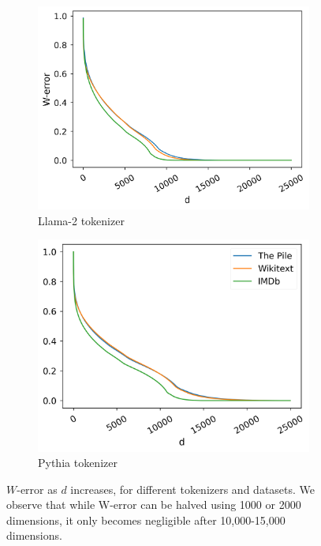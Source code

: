 \begin{figure}[h]
\centering
    \begin{subfigure}{0.415\columnwidth}
         \includegraphics[width=\linewidth]{sources/part_1/softmax_bottleneck/imgs/llama_sv_4gram.png}
         \caption{Llama-2 tokenizer}
         \label{fig:llama}
    \end{subfigure}
    \begin{subfigure}{0.4\columnwidth}
         \includegraphics[width=\linewidth]{sources/part_1/softmax_bottleneck/imgs/pythia_sv_4gram.png}
         \caption{Pythia tokenizer}
         \label{fig:pythia}
    \end{subfigure}
    \caption{$W$-error as $d$ increases, for different tokenizers and datasets. We observe that while W-error can be halved using 1000 or 2000 dimensions, it only becomes negligible after 10,000-15,000 dimensions.}
    \label{fig:w_error}
\end{figure}


